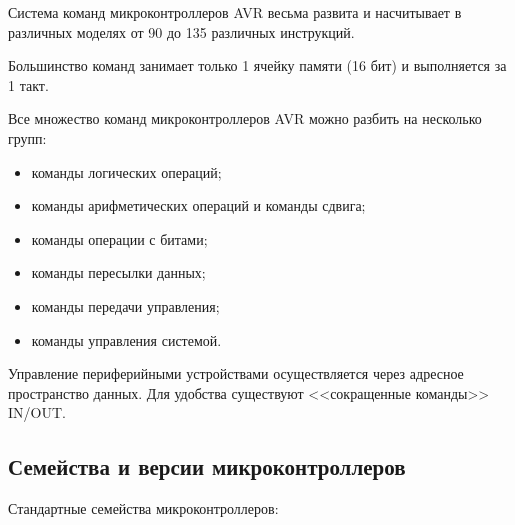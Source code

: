 \documentclass[12pt, oneside]{altsu-report}
\begin{document}
Система команд микроконтроллеров AVR весьма развита и насчитывает в различных моделях от 90 до 135 различных инструкций.

Большинство команд занимает только 1 ячейку памяти (16 бит) и выполняется за 1 такт.

Все множество команд микроконтроллеров AVR можно разбить на несколько групп:~\cite{wikiRUAVR}

\begin{itemize}
    \item команды логических операций;

    \item команды арифметических операций и команды сдвига;

    \item команды операции с битами;

    \item команды пересылки данных;

    \item команды передачи управления;

    \item команды управления системой.
\end{itemize}

Управление периферийными устройствами осуществляется через адресное пространство данных. Для удобства существуют <<сокращенные команды>> IN/OUT.~\cite{wikiRUAVR}

\subsection{Семейства и версии микроконтроллеров}

Стандартные семейства микроконтроллеров:
\end{document}
